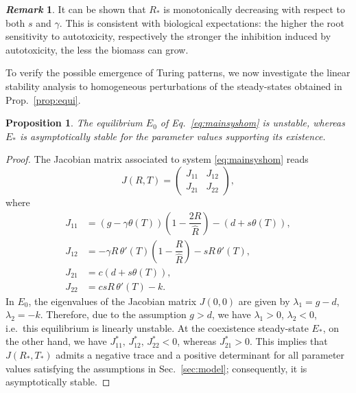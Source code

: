 \documentclass[11pt]{elsarticle}
\theoremstyle{plain}
\newtheorem{prop}[thm]{Proposition}
\theoremstyle{definition}
\theoremstyle{myremark}
\newtheorem*{remark}{\textit{Remark}}
\newcommand{\q}[1]{\todo[inline, color=orange!30]{\textbf{Q: }#1}}
\begin{document}

\begin{remark}
It can be shown that $R_*$ is monotonically decreasing with respect to both $s$ and $\gamma$. This is consistent with biological expectations: the higher the root sensitivity to autotoxicity, respectively the stronger the inhibition induced by autotoxicity, the less the biomass can grow.
\end{remark}

To verify the possible emergence of Turing patterns, we now investigate the linear stability analysis to homogeneous perturbations of the steady-states obtained in Prop.~\ref{prop:equi}.

\begin{prop} \label{prop:stabhom}
    The equilibrium $E_0$ of Eq.~\eqref{eq:mainsyshom} is unstable, whereas $E_*$ is asymptotically stable for the parameter values supporting its existence.
\end{prop}
\begin{proof}
The Jacobian matrix associated to system \eqref{eq:mainsyshom} reads
\begin{equation}
J(R,T)=
\begin{pmatrix} 
J_{11} & J_{12} \\ J_{21} & J_{22} \end{pmatrix},
\end{equation}
where
\begin{align*}
    J_{11}&=\left(g-\gamma\theta(T)\right)\left(1-\dfrac{2R}{\hat{R}}\right)-\left(d+s\theta(T)\right),\\
    J_{12}&=-\gamma R\, \theta'(T) \left(1-\dfrac{R}{\hat{R}}\right)-sR\, \theta'(T),\\
    J_{21}&=c\left(d+s\theta(T)\right),\\
    J_{22}&=cs R\, \theta'(T)-k.
\end{align*}
In $E_0$, the eigenvalues of the Jacobian matrix $J(0,0)$ are given by $\lambda_1=g-d$, $\lambda_2=-k$. Therefore, due to the assumption $g>d$, we have $\lambda_1>0$, $\lambda_2 < 0$, i.e.~this equilibrium is linearly unstable. At the coexistence steady-state $E_*$, on the other hand, we have $J_{11}^*,\,J_{12}^*,\,J_{22}^*<0$, whereas $J_{21}^*>0$. This implies that $J(R_*,T_*)$ admits a negative trace and a positive determinant for all parameter values satisfying the assumptions in Sec.~\ref{sec:model}; consequently, it is asymptotically stable.
\end{proof}
\end{document}
